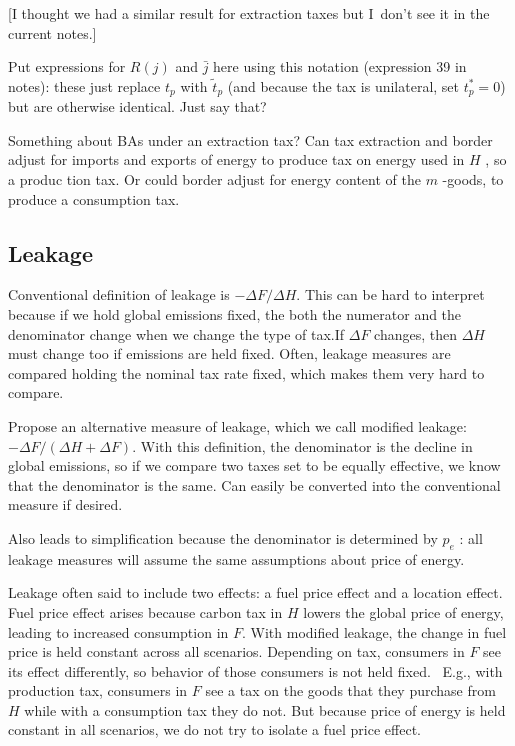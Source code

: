 \documentclass[notitlepage,12pt]{article}
\begin{document}
[I thought we had a similar result for extraction taxes but I\ don't see it
in the current notes.]

Put expressions for $R\left( j\right) $ and $\bar{j}$ here using this
notation (expression 39 in notes): these just replace $t_{p}$ with $\tilde{t}%
_{p}$ (and because the tax is unilateral, set $t_{p}^{\ast }=0$) but are
otherwise identical. Just say that? 

Something about BAs under an extraction tax? Can tax extraction and border
adjust for imports and exports of energy to produce tax on energy used in $H$%
, so a produc tion tax. Or could border adjust for energy content of the $m$%
-goods, to produce a consumption tax.

\subsection{Leakage}

Conventional definition of leakage is $-\Delta F/\Delta H$. This can be hard
to interpret because if we hold global emissions fixed, the both the
numerator and the denominator change when we change the type of tax.If $%
\Delta F$ changes, then $\Delta H$ must change too if emissions are held
fixed. Often, leakage measures are compared holding the nominal tax rate
fixed, which makes them very hard to compare.

Propose an alternative measure of leakage, which we call modified leakage: $%
-\Delta F/\left( \Delta H+\Delta F\right) $. With this definition, the
denominator is the decline in global emissions, so if we compare two taxes
set to be equally effective, we know that the denominator is the same. Can
easily be converted into the conventional measure if desired.

Also leads to simplification because the denominator is determined by $p_{e}$%
: all leakage measures will assume the same assumptions about price of
energy.

Leakage often said to include two effects: a fuel price effect and a
location effect. Fuel price effect arises because carbon tax in $H$ lowers
the global price of energy, leading to increased consumption in $F$. With
modified leakage, the change in fuel price is held constant across all
scenarios. Depending on tax, consumers in $F$ see its effect differently, so
behavior of those consumers is not held fixed. \ E.g., with production tax,
consumers in $F$ see a tax on the goods that they purchase from $H$ while
with a consumption tax they do not. But because price of energy is held
constant in all scenarios, we do not try to isolate a fuel price effect.
\end{document}
